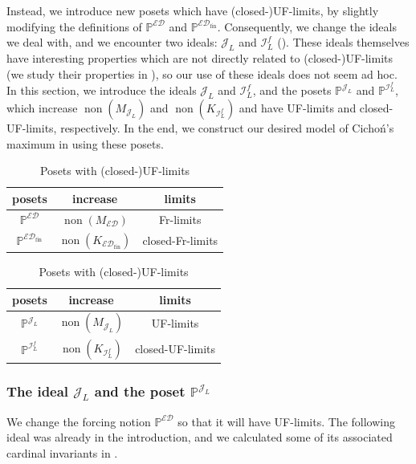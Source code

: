 \documentclass[a4paper,12pt]{amsart}
\theoremstyle{definition}
\numberwithin{thm}{section}
\numberwithin{equation}{section}
\DeclareMathOperator{\non}{non}
\newcommand{\ed}{\mathcal{ED}}
\newcommand{\I}{\mathscr{I}}
\newcommand{\J}{\mathscr{J}}
\newcommand{\dif}{\mathbb{P}^{\I_L^f}}
\newcommand{\edfin}{\mathcal{ED}_\mathrm{fin}}
\newcommand{\posetEDfin}{\mathbb{P}^{\edfin}}
\newcommand{\posetED}{\mathbb{P}^{\ed}}
\newcommand{\posetJL}{\mathbb{P}^{\J_L}}
\begin{document}
    Instead, we introduce new posets which have (closed-)UF-limits, by slightly modifying the definitions of $\posetED$ and $\posetEDfin$. 
    Consequently, we change the ideals we deal with, and we encounter two ideals: $\J_L$ and $\I^f_L$ ().
    These ideals themselves have interesting properties which are not directly related to (closed-)UF-limits (we study their properties in ), so our use of these ideals does not seem ad hoc.
    In this section, we introduce the ideals $\J_L$ and $\I^f_L$, and the posets $\posetJL$ and $\dif$, which increase $\non(M_{\J_L})$ and $\non(K_{\I_L^f})$ and have UF-limits and closed-UF-limits, respectively. In the end, we construct our desired model of Cicho\'n's maximum in  using these posets.
    
    \begin{table}[h]
    	\begin{minipage}[h]{0.49\textwidth}
    		\caption{Posets with (closed-)Fr-limits}\label{table:Fr-limits}
    		\centering
    		\begin{tabular}{c|c|c}
    			 posets & increase & limits    \\  
    			\hline
    			 $\posetED$ &      $\non(M_{\ed})$ & Fr-limits \\
    			 $\posetEDfin$ &      $\non(K_{\edfin})$ & closed-Fr-limits  
    		\end{tabular}
    		
    	\end{minipage}
    	\begin{minipage}[h]{0.49\textwidth}
    		\caption{Posets with (closed-)UF-limits}\label{table:UF-limits}
    		\centering
    		\begin{tabular}{c|c|c}
    			  posets & increase & limits   \\  
    			\hline
    			 $\posetJL$ &      $\non(M_{\J_L})$ & UF-limits  \\
    			 $\dif$ &      $\non(K_{\I_L^f})$ & closed-UF-limits  
    		\end{tabular}
    		
    	\end{minipage}
    \end{table}

    \subsubsection{The ideal $\J_L$ and the poset $\posetJL$}
    
    We change the forcing notion $\posetED$ so that it will have UF-limits. The following ideal was already in the introduction, and we calculated some of its associated cardinal invariants in .
    
\end{document}
